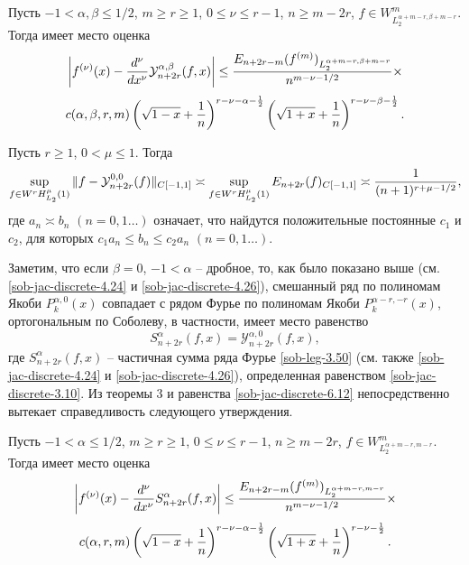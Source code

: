 \begin{theorem}     Пусть $-1<\alpha,\beta\le
1/2$, $m\ge r\ge1$, $0\le \nu\le r-1$, $n\ge m-2r$, $f\in W_{{L}_2^{\alpha+m-r,\beta+m-r}}^m$. Тогда имеет  место оценка $$
\left|f^{(\nu)}(x)-{d^\nu\over
dx^\nu} \mathcal{Y}_{n+2r}^{\alpha,\beta}(f,x)\right|\le {E_{n+2r-m}(f^{(m)})_{{L}_2^{\alpha+m-r,\beta+m-r}}\over n^{m-\nu-1/2}}\times
     $$
     $$
c(\alpha,\beta,r,m)
\left(\sqrt{1-x}+{1\over n}\right)^{r-\nu-\alpha-{1\over2}}
\left(\sqrt{1+x}+{1\over n}\right)^{r-\nu-\beta-{1\over2}}.
$$
\end{theorem}

\begin{corollary}
       Пусть $r\ge1$, $0<\mu\le1$. Тогда
                $$
       \sup_{f\in W^rH^\mu_{{L}_2}(1)}
      \|f-\mathcal{Y}_{n+2r}^{0,0}(f)\|_{C[-1,1]}\asymp
      \sup_{f\in W^rH^\mu_{{L}_2}(1)}
      E_{n+2r}(f)_{C[-1,1]}\asymp {1\over (n+1)^{r+\mu-1/2}},
                $$
  где $a_n\asymp b_n$ $(n=0,1\ldots)$ означает, что
 найдутся положительные постоянные
      $c_1$ и $c_2$, для которых $c_1a_n\le b_n\le c_2a_n$
 $(n=0,1\ldots)$.
\end{corollary}

Заметим, что если $\beta=0$, $-1<\alpha$ -- дробное, то, как было показано выше (см.\eqref{sob-jac-discrete-4.24}  и \eqref{sob-jac-discrete-4.26}), смешанный ряд по полиномам Якоби $P_k^{\alpha,0}(x)$ совпадает с рядом Фурье по полиномам Якоби  $P_k^{\alpha-r,-r}(x)$, ортогональным по Соболеву, в частности, имеет место равенство
\begin{equation}\label{sob-jac-discrete-6.12}
S_{n+2r}^\alpha(f,x)= \mathcal{Y}_{n+2r}^{\alpha,0}(f,x),
\end{equation}
 где $S_{n+2r}^\alpha(f,x)$ -- частичная сумма ряда Фурье \eqref{sob-leg-3.50} (см. также  \eqref{sob-jac-discrete-4.24} и   \eqref{sob-jac-discrete-4.26}), определенная равенством
\eqref{sob-jac-discrete-3.10}. Из теоремы 3 и равенства \eqref{sob-jac-discrete-6.12} непосредственно вытекает справедливость следующего утверждения.


\begin{corollary}
   Пусть $-1<\alpha\le1/2$,  $m\ge r\ge1$, $0\le \nu\le r-1$, $n\ge m-2r$,  $f\in W_{{
L}_2^{\alpha+m-r,m-r}}^m$. Тогда имеет  место оценка
$$
\left|f^{(\nu)}(x)-{d^\nu\over dx^\nu} S_{n+2r}^\alpha(f,x)\right|\le {E_{n+2r-m}(f^{(m)})_{{L}_2^{\alpha+m-r,m-r}}\over n^{m-\nu-1/2}}\times
     $$
     $$
c(\alpha,r,m)
\left(\sqrt{1-x}+{1\over n}\right)^{r-\nu-\alpha-{1\over2}}
\left(\sqrt{1+x}+{1\over n}\right)^{r-\nu-{1\over2}}.
$$
\end{corollary}

